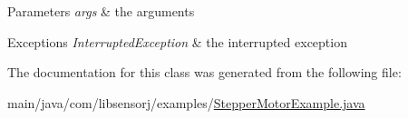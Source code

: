 \begin{DoxyParams}{Parameters}
{\em args} & the arguments \\
\hline
\end{DoxyParams}

\begin{DoxyExceptions}{Exceptions}
{\em Interrupted\+Exception} & the interrupted exception \\
\hline
\end{DoxyExceptions}


The documentation for this class was generated from the following file\+:\begin{DoxyCompactItemize}
\item 
main/java/com/libsensorj/examples/\hyperlink{StepperMotorExample_8java}{Stepper\+Motor\+Example.\+java}\end{DoxyCompactItemize}
